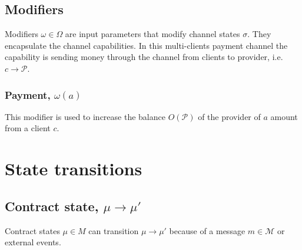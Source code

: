 \documentclass{llncs}
\begin{document}
\subsection{Modifiers} Modifiers $\omega \in \Omega$ are input parameters that modify channel states $\sigma$. They encapsulate the channel capabilities. In this multi-clients payment channel the capability is sending money through the channel from clients to provider, i.e. $c \rightarrow \mathcal{P}$.

\subsubsection{Payment, $\omega(a)$} This modifier is used to increase the balance $O(\mathcal{P})$ of the provider of $a$ amount from a client $c$.

\section{State transitions}

\subsection{Contract state, $\mu \rightarrow \mu'$} Contract states $\mu \in M$ can transition $\mu \rightarrow \mu'$ because of a message $m \in \mathcal{M}$ or external events.
\end{document}
